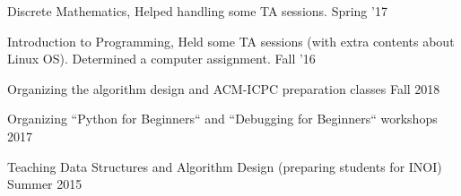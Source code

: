 \begin{cvtas}
  \cvta
    {Discrete Mathematics, } %
    {Helped handling some TA sessions.} %
    {Spring '17} %
    {} %

  \cvta
    {Introduction to Programming, } %
    {Held some TA sessions (with extra contents about Linux OS). Determined a computer assignment.} %
    {Fall '16} %
    {} %


\end{cvtas}




\begin{cvtas}

  \cvta
    {} %
    {Organizing the algorithm design and ACM-ICPC preparation classes}
    {Fall 2018} %
    {} %





  \cvta
    {} %
    {Organizing ``Python for Beginners`` and ``Debugging for Beginners`` workshops} %
    {2017} %
    {} %

  \cvta
    {} %
    {Teaching Data Structures and Algorithm Design (preparing students for INOI)} %
    {Summer 2015} %
    {} %

\end{cvtas}